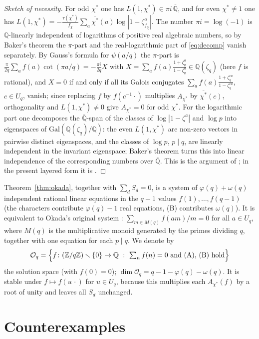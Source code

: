\documentclass[11pt]{amsart}
\theoremstyle{definition}
\theoremstyle{remark}
\providecommand{\Q}{\mathbb Q}
\providecommand{\Z}{\mathbb Z}
\providecommand{\Qb}{\overline{\mathbb Q}}
\newcommand{\Ok}{\mathcal O}
\numberwithin{equation}{section}
\begin{document}
\begin{proof}[Sketch of necessity]
For odd $\chi^*$ one has $L(1,\chi^*)\in\pi i\,\Qb$, and for even $\chi^*\neq1$ one has $L(1,\chi^*)=-\frac{\tau(\chi^*)}{f_\chi}\sum_{a}\overline{\chi^*}(a)\log|1-\zeta_{f_\chi}^{a}|$.
The number $\pi i=\log(-1)$ is $\Q$-linearly independent of logarithms of positive real algebraic numbers, so by Baker's theorem the $\pi$-part and the real-logarithmic part of \eqref{eq:decomp} vanish separately.
By Gauss's formula for $\psi(a/q)$ the $\pi$-part is $\frac{\pi}{2q}\sum_af(a)\cot(\pi a/q)=-\frac{\pi i}{2q}X$ with $X=\sum_af(a)\frac{1+\zeta_q^a}{1-\zeta_q^a}\in\Q(\zeta_q)$ (here $f$ is rational), and $X=0$ if and only if all its Galois conjugates $\sum_af(a)\frac{1+\zeta_q^{ca}}{1-\zeta_q^{ca}}$, $c\in U_q$, vanish; since replacing $f$ by $f(c^{-1}\cdot)$ multiplies $A_{\chi^*}$ by $\overline{\chi^*}(c)$, orthogonality and $L(1,\chi^*)\neq0$ give $A_{\chi^*}=0$ for odd $\chi^*$.
For the logarithmic part one decomposes the $\Qb$-span of the classes of $\log|1-\zeta^a|$ and $\log p$ into eigenspaces of $\mathrm{Gal}(\Q(\zeta_q)/\Q)$: the even $L(1,\chi^*)$ are non-zero vectors in pairwise distinct eigenspaces, and the classes of $\log p$, $p\mid q$, are linearly independent in the invariant eigenspace; Baker's theorem turns this into linear independence of the corresponding numbers over $\Qb$.
This is the argument of \cite{BBW73,Oka82}; in the present layered form it is \cite[Thm.~4]{Bha22}.
\end{proof}

Theorem~\ref{thm:okada}, together with $\sum_dS_d=0$, is a system of $\varphi(q)+\omega(q)$ independent rational linear equations in the $q-1$ values $f(1),\dots,f(q-1)$ (the characters contribute $\varphi(q)-1$ real equations, (B) contributes $\omega(q)$).
It is equivalent to Okada's original system \cite{Oka82}: $\sum_{m\in M(q)}f(am)/m=0$ for all $a\in U_q$, where $M(q)$ is the multiplicative monoid generated by the primes dividing $q$, together with one equation for each $p\mid q$.
We denote by
\[
\Ok_q=\Bigl\{f\colon(\Z/q\Z)\smallsetminus\{0\}\to\Q\ :\ \textstyle\sum_nf(n)=0\text{ and (A), (B) hold}\Bigr\}
\]
the solution space (with $f(0)=0$); $\dim\Ok_q=q-1-\varphi(q)-\omega(q)$.
It is stable under $f\mapsto f(u\,\cdot)$ for $u\in U_q$, because this multiplies each $A_{\chi^*}(f)$ by a root of unity and leaves all $S_d$ unchanged.

\section{Counterexamples}\label{sec:counter}
\end{document}
